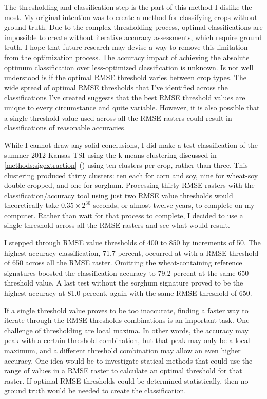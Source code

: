 The thresholding and classification step is the part of this method I dislike the most. My original intention was to create a method for classifying crops without ground truth. Due to the complex thresholding process, optimal classifications are impossible to create without iterative accuracy assessments, which require ground truth. I hope that future research may devise a way to remove this limitation from the optimization process. The accuracy impact of achieving the absolute optimum classification over less-optimized classification is unknown. Is not well understood is if the optimal RMSE threshold varies between crop types. The wide spread of optimal RMSE thresholds that I’ve identified across the classifications I've created suggests that the best RMSE threshold values are unique to every circumstance and quite variable. However, it is also possible that a single threshold value used across all the RMSE rasters could result in classifications of reasonable accuracies.

While I cannot draw any solid conclusions, I did make a test classification of the summer 2012 Kansas TSI using the k-means clustering discussed in \autoref{methods:sigextraction} () using ten clusters per crop, rather than three. This clustering produced thirty clusters: ten each for corn and soy, nine for wheat-soy double cropped, and one for sorghum. Processing thirty RMSE rasters with the classification/accuracy tool using just two RMSE value thresholds would theoretically take $0.35\times2^{30}$ seconds, or almost twelve years, to complete on my computer. Rather than wait for that process to complete, I decided to use a single threshold across all the RMSE rasters and see what would result.

I stepped through RMSE value thresholds of 400 to 850 by increments of 50. The highest accuracy classification, 71.7 percent, occurred at with a RMSE threshold of 650 across all the RMSE raster. Omitting the wheat-containing reference signatures boosted the classification accuracy to 79.2 percent at the same 650 threshold value. A last test without the sorghum signature proved to be the highest accuracy at 81.0 percent, again with the same RMSE threshold of 650.

If a single threshold value proves to be too inaccurate, finding a faster way to iterate through the RMSE thresholds combinations is an important task. One challenge of thresholding are local maxima. In other words, the accuracy may peak with a certain threshold combination, but that peak may only be a local maximum, and a different threshold combination may allow an even higher accuracy. One idea would be to investigate statical methods that could use the range of values in a RMSE raster to calculate an optimal threshold for that raster. If optimal RMSE thresholds could be determined statistically, then no ground truth would be needed to create the classification.
